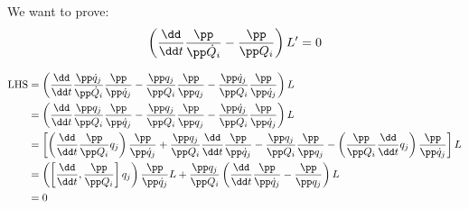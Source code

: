 \documentclass[12pt]{article}
\begin{document}
We want to prove:
\[\left(\frac{\dd}{\dd t}\frac{\pp}{\pp \dot Q_i}-\frac{\pp}{\pp Q_i}\right)L'=0\]

\begin{align}
\mathrm{LHS}
&=\left(\frac{\dd}{\dd t}\frac{\pp \dot q_j}{\pp \dot Q_i}\frac{\pp}{\pp \dot q_j}-\frac{\pp q_j}{\pp Q_i}\frac{\pp }{\pp q_j}-\frac{\pp \dot q_j}{\pp Q_i}\frac{\pp }{\pp\dot q_j}\right)L\\
&=\left(\frac{\dd}{\dd t}\frac{\pp q_j}{\pp Q_i}\frac{\pp}{\pp\dot q_j}-\frac{\pp q_j}{\pp Q_i}\frac{\pp }{\pp q_j}-\frac{\pp \dot q_j}{\pp Q_i}\frac{\pp }{\pp\dot q_j}\right)L\\
&=\left[\left(\frac{\dd}{\dd t}\frac{\pp}{\pp Q_i}q_j\right)\frac{\pp}{\pp \dot q_j}+\frac{\pp q_j}{\pp Q_i}\frac{\dd}{\dd t}\frac{\pp}{\pp \dot q_j}-\frac{\pp q_j}{\pp Q_i}\frac{\pp }{\pp q_j}-\left(\frac{\pp}{\pp Q_i}\frac{\dd}{\dd t}q_j\right)\frac{\pp }{\pp\dot q_j}\right]L\\
&=\left(\left[\frac{\dd}{\dd t}, \frac{\pp}{\pp Q_i}\right]q_j\right)\frac{\pp}{\pp \dot q_j}L+\frac{\pp q_j}{\pp Q_i}\left(\frac{\dd}{\dd t}\frac{\pp}{\pp \dot q_j}-\frac{\pp }{\pp q_j}\right)L\\
&=0
\end{align}
\end{document}
